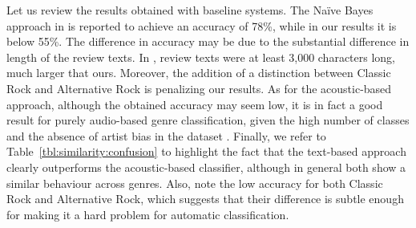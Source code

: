 
Let us review the results obtained with baseline systems. The Na\"{i}ve Bayes approach in \cite{Hu2005} is reported to achieve an accuracy of 78\%, while in our results it is below 55\%. The difference in accuracy may be due to the substantial difference in length of the review texts. In \cite{Hu2005}, review texts were at least 3,000 characters long, much larger that ours. Moreover, the addition of a distinction between Classic Rock and Alternative Rock is penalizing our results. 
As for the acoustic-based approach, although the obtained accuracy may seem low, it is in fact a good result for purely audio-based genre classification, given the high number of classes and the absence of artist bias in the dataset \citep{bogdanov2016cross}.
Finally, we refer to Table~\ref{tbl:similarity:confusion} to highlight the fact that the text-based approach clearly outperforms the acoustic-based classifier, although in general both show a similar behaviour across genres. Also, note the low accuracy for both Classic Rock and Alternative Rock, which suggests that their difference is subtle enough for making it a hard problem for automatic classification.

